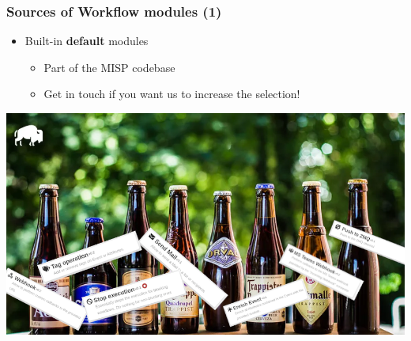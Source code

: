 \begin{frame}
    \frametitle{Sources of Workflow modules (1)}
    \begin{itemize}
        \item Built-in \textbf{default} modules
        \begin{itemize}
            \item Part of the MISP codebase
            \item Get in touch if you want us to increase the selection!
        \end{itemize}
    \end{itemize}
    \begin{center}
        \includegraphics[width=1.0\linewidth]{pictures/module-buffet.png}
    \end{center}
\end{frame}

